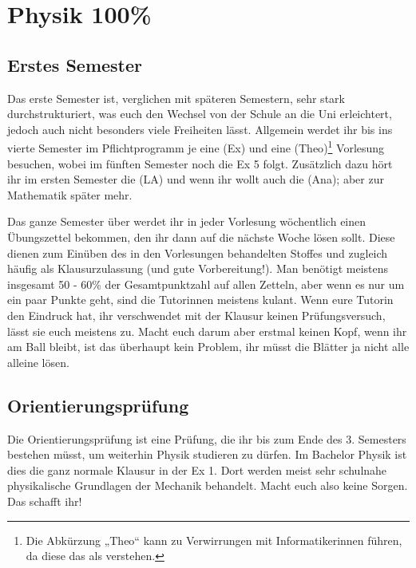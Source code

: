 \section{Physik 100\%}

\subsection{Erstes Semester}
Das erste Semester ist, verglichen mit späteren Semestern, sehr stark durchstrukturiert, was euch den Wechsel von der Schule an die Uni erleichtert, jedoch auch nicht besonders viele Freiheiten lässt.  Allgemein werdet ihr bis ins vierte Semester im Pflichtprogramm je eine  (\gls{Ex}) und eine  (\gls{Theo})\footnote{Die Abkürzung „Theo“ kann zu Verwirrungen mit Informatikerinnen führen, da diese das als  verstehen.} Vorlesung besuchen, wobei im fünften Semester noch die \gls{Ex} 5 folgt. Zusätzlich dazu hört ihr im ersten Semester die  (\gls{LA}) und wenn ihr wollt auch die  (\gls{Ana}); aber zur Mathematik später mehr.

Das ganze Semester über werdet ihr in jeder Vorlesung wöchentlich einen Übungszettel bekommen, den ihr dann auf die nächste Woche lösen sollt. Diese dienen zum Einüben des in den Vorlesungen behandelten Stoffes und zugleich häufig als Klausurzulassung (und gute Vorbereitung!). Man benötigt meistens insgesamt 50 - 60\% der Gesamtpunktzahl auf allen Zetteln, aber wenn es nur um ein paar Punkte geht, sind die Tutorinnen meistens kulant. Wenn eure Tutorin den Eindruck hat, ihr verschwendet mit der Klausur keinen Prüfungsversuch, lässt sie euch meistens zu. Macht euch darum aber erstmal keinen Kopf, wenn ihr am Ball bleibt, ist das überhaupt kein Problem, ihr müsst die Blätter ja nicht alle alleine lösen.

\subsection{Orientierungsprüfung}
Die Orientierungsprüfung ist eine Prüfung, die ihr bis zum Ende des 3. Semesters bestehen müsst, um weiterhin Physik studieren zu dürfen. Im Bachelor Physik ist dies die ganz normale Klausur in der \gls{Ex} 1. Dort werden meist sehr schulnahe physikalische Grundlagen der Mechanik behandelt. Macht euch also keine Sorgen. Das schafft ihr!


